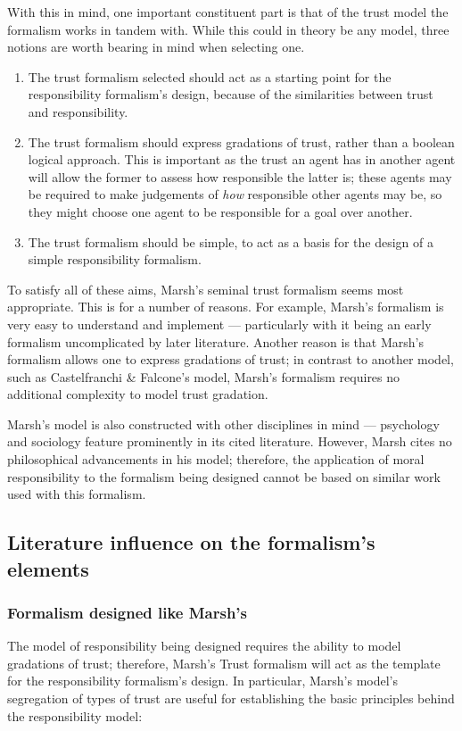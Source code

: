 With this in mind, one important constituent part is that of the trust model the formalism works in tandem with. While this could in theory be any model, three notions are worth bearing in mind when selecting one.
\begin{enumerate}
    \item The trust formalism selected should act as a starting point for the responsibility formalism's design, because of the similarities between trust and responsibility.
    \item The trust formalism should express gradations of trust, rather than a boolean logical approach. This is important as the trust an agent has in another agent will allow the former to assess how responsible the latter is; these agents may be required to make judgements of \emph{how} responsible other agents may be, so they might choose one agent to be responsible for a goal over another.
    \item The trust formalism should be simple, to act as a basis for the design of a simple responsibility formalism.
\end{enumerate}

To satisfy all of these aims, Marsh's seminal trust formalism seems most appropriate. This is for a number of reasons. For example, Marsh's formalism is very easy to understand and implement --- particularly with it being an early formalism uncomplicated by later literature. Another reason is that Marsh's formalism allows one to express gradations of trust; in contrast to another model, such as Castelfranchi \& Falcone's model, Marsh's formalism requires no additional complexity to model trust gradation.\par

Marsh's model is also constructed with other disciplines in mind --- psychology and sociology feature prominently in its cited literature. However, Marsh cites no philosophical advancements in his model; therefore, the application of moral responsibility to the formalism being designed cannot be based on similar work used with this formalism.\par

\subsection{Literature influence on the formalism's elements}
\subsubsection{Formalism designed like Marsh's}
The model of responsibility being designed requires the ability to model gradations of trust; therefore, Marsh's Trust formalism will act as the template for the responsibility formalism's design. In particular, Marsh's model's segregation of types of trust are useful for establishing the basic principles behind the responsibility model:

